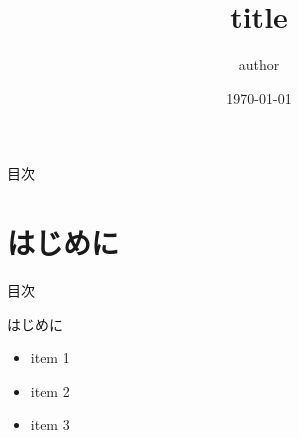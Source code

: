 \documentclass[aspectratio=169, dvipdfmx, 11pt, xcolor={usenames, dvipsnames}]{beamer} %
\title[]{title}
\author[]{author}
\date{\today}
\begin{document}
\maketitle

\begin{frame}{目次}
	\tableofcontents
\end{frame}

\section{はじめに}
\begin{frame}{目次}
	\tableofcontents[currentsection]
\end{frame}

\begin{frame}{はじめに}
	\begin{itemize}
		\item item 1
		\item item 2
		\item item 3
	\end{itemize}
\end{frame}
\end{document}
